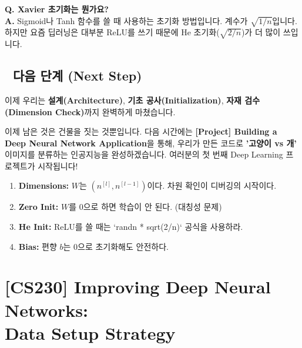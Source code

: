 \documentclass[11pt,a4paper]{book}
\theoremstyle{definition}
\begin{document}
\textbf{Q. Xavier 초기화는 뭔가요?} \\
\textbf{A.} Sigmoid나 Tanh 함수를 쓸 때 사용하는 초기화 방법입니다. 계수가 $\sqrt{1/n}$입니다. 하지만 요즘 딥러닝은 대부분 ReLU를 쓰기 때문에 He 초기화($\sqrt{2/n}$)가 더 많이 쓰입니다.

\section*{🔗 다음 단계 (Next Step)}
이제 우리는 \textbf{설계(Architecture)}, \textbf{기초 공사(Initialization)}, \textbf{자재 검수(Dimension Check)}까지 완벽하게 마쳤습니다.

이제 남은 것은 건물을 짓는 것뿐입니다. 다음 시간에는 \textbf{[Project] Building a Deep Neural Network Application}을 통해, 우리가 만든 코드로 \textbf{'고양이 vs 개'} 이미지를 분류하는 인공지능을 완성하겠습니다. 여러분의 첫 번째 Deep Learning 프로젝트가 시작됩니다!

\vspace{0.5cm}

\begin{summarybox}[title={단원 요약 (Cheat Sheet)}]
\begin{enumerate}
    \item \textbf{Dimensions:} $W$는 $(n^{[l]}, n^{[l-1]})$이다. 차원 확인이 디버깅의 시작이다.
    \item \textbf{Zero Init:} $W$를 0으로 하면 학습이 안 된다. (대칭성 문제)
    \item \textbf{He Init:} ReLU를 쓸 때는 `randn * sqrt(2/n)` 공식을 사용하라.
    \item \textbf{Bias:} 편향 $b$는 0으로 초기화해도 안전하다.
\end{enumerate}
\end{summarybox}


\chapter{[CS230] Improving Deep Neural Networks: \\ Data Setup Strategy}
\label{ch:lecture11}

\end{document}
